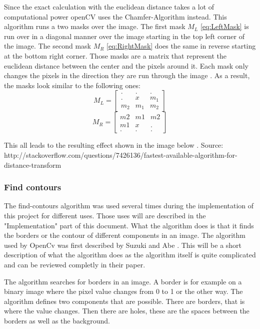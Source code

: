 Since the exact calculation with the euclidean distance takes a lot of computational power openCV uses the Chamfer-Algorithm instead. This algorithm runs a two masks over the image. The first mask $M_{L}$ \eqref{eq:LeftMask} is run over in a diagonal manner over the image starting in the top left corner of the image. The second mask $M_{R}$ \eqref{eq:RightMask} does the same in reverse starting at the bottom right corner. Those masks are a matrix that represent the euclidean distance between the center and the pixels around it. Each mask only changes the pixels in the direction they are run through the image \citep{burger_burge_2016}. As a result, the masks look similar to the following ones:
\begin{equation}\label{eq:LeftMask} M_{L} = \begin{bmatrix} . & . & .\\ . & x & m_1 \\ m_2 & m_1 & m_2 \end{bmatrix}\end{equation}
\begin{equation}\label{eq:RightMask}M_{R} = \begin{bmatrix} m2 & m1 & m2 \\ m1 & x & . \\ . & . & . \end{bmatrix} \end{equation}

This all leads to the resulting effect shown in the image below \citep[Section 3.3.3]{szeliski_2011}.
Source: http://stackoverflow.com/questions/7426136/fastest-available-algorithm-for-distance-transform

\subsubsection{Find contours}
The find-contours algorithm was used several times during the implementation of this project for different uses. Those uses will are described in the "Implementation" part of this document. What the algorithm does is that it finds the borders or the contour of different components in an image. The algorithm used by OpenCv was first described by Suzuki and Abe \cite{suzuki_abe_1985}. This will be a short description of what the algorithm does as the algorithm itself is quite complicated and can be reviewed completly in their paper.

The algorithm searches for borders in an image. A border is for example on a binary image where the pixel value changes from 0 to 1 or the other way. The algorithm defines two components that are possible. There are borders, that is where the value changes. Then there are holes, these are the spaces between the borders as well as the background.

